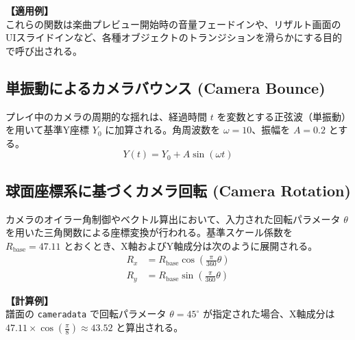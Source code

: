 \documentclass[a4paper,11pt]{ltjsarticle}
\begin{document}
\textbf{【適用例】} \\
これらの関数は楽曲プレビュー開始時の音量フェードインや、リザルト画面のUIスライドインなど、各種オブジェクトのトランジションを滑らかにする目的で呼び出される。

\subsection{単振動によるカメラバウンス (Camera Bounce)}
プレイ中のカメラの周期的な揺れは、経過時間 $t$ を変数とする正弦波（単振動）を用いて基準Y座標 $Y_0$ に加算される。角周波数を $\omega = 10$、振幅を $A = 0.2$ とする。
\begin{equation}
    Y(t) = Y_0 + A \sin(\omega t)
\end{equation}

\subsection{球面座標系に基づくカメラ回転 (Camera Rotation)}
カメラのオイラー角制御やベクトル算出において、入力された回転パラメータ $\theta$ を用いた三角関数による座標変換が行われる。基準スケール係数を $R_{\mathrm{base}} = 47.11$ とおくとき、X軸およびY軸成分は次のように展開される。
\begin{align}
    R_x &= R_{\mathrm{base}} \cos\left(\frac{\pi}{360} \theta\right) \\
    R_y &= R_{\mathrm{base}} \sin\left(\frac{\pi}{360} \theta\right)
\end{align}

\textbf{【計算例】} \\
譜面の \texttt{cameradata} で回転パラメータ $\theta = 45^\circ$ が指定された場合、X軸成分は $47.11 \times \cos\left(\frac{\pi}{8}\right) \approx 43.52$ と算出される。
\end{document}
